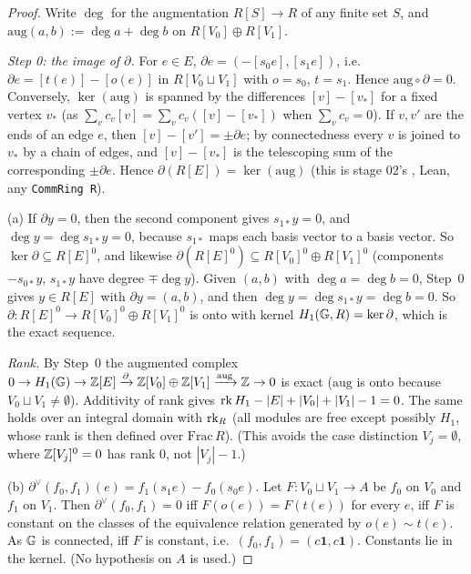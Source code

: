\begin{proof}
Write $\deg$ for the augmentation $R[S]\to R$ of any finite set $S$, and $\mathrm{aug}(a,b):=\deg a+\deg b$ on $R[V_0]\oplus R[V_1]$.

\emph{Step 0: the image of $\partial$.} For $e\in E$, $\partial e=(-[s_0e],[s_1e])$, i.e.\ $\partial e=[t(e)]-[o(e)]$ in $R[V_0\sqcup V_1]$ with
$o=s_0$, $t=s_1$. Hence $\mathrm{aug}\circ\partial=0$. Conversely, $\ker(\mathrm{aug})$ is spanned by the differences $[v]-[v_*]$ for a fixed vertex
$v_*$ (as $\sum_vc_v[v]=\sum_vc_v([v]-[v_*])$ when $\sum_vc_v=0$). If $v,v'$ are the ends of an edge $e$, then $[v]-[v']=\pm\partial e$; by
connectedness every $v$ is joined to $v_*$ by a chain of edges, and $[v]-[v_*]$ is the telescoping sum of the corresponding $\pm\partial e$. Hence
$\partial(R[E])=\ker(\mathrm{aug})$ (this is stage 02's , Lean, any \texttt{CommRing R}).

(a) If $\partial y=0$, then the second component gives $s_{1*}y=0$, and $\deg y=\deg s_{1*}y=0$, because $s_{1*}$ maps each basis vector to a basis
vector. So $\ker\partial\subseteq R[E]^0$, and likewise $\partial(R[E]^0)\subseteq R[V_0]^0\oplus R[V_1]^0$ (components $-s_{0*}y$, $s_{1*}y$ have degree
$\mp\deg y$). Given $(a,b)$ with $\deg a=\deg b=0$, Step~0 gives $y\in R[E]$ with $\partial y=(a,b)$, and then $\deg y=\deg s_{1*}y=\deg b=0$. So
$\partial:R[E]^0\to R[V_0]^0\oplus R[V_1]^0$ is onto with kernel $H_1(\mathbb{G},R)=\ker\partial$, which is the exact sequence.

\emph{Rank.} By Step~0 the augmented complex $0\to H_1(\mathbb{G})\to\mathbb{Z}[E]\xrightarrow{\partial}\mathbb{Z}[V_0]\oplus\mathbb{Z}[V_1]\xrightarrow{\mathrm{aug}}\mathbb{Z}\to0$ is exact
($\mathrm{aug}$ is onto because $V_0\sqcup V_1\ne\emptyset$). Additivity of rank gives $\operatorname{rk} H_1-|E|+|V_0|+|V_1|-1=0$. The same holds over an integral
domain with $\operatorname{rk}_R$ (all modules are free except possibly $H_1$, whose rank is then defined over $\mathrm{Frac}\,R$). (This avoids the case
distinction $V_j=\emptyset$, where $\mathbb{Z}[V_j]^0=0$ has rank $0$, not $|V_j|-1$.)

(b) $\partial^\vee(f_0,f_1)(e)=f_1(s_1e)-f_0(s_0e)$. Let $F:V_0\sqcup V_1\to A$ be $f_0$ on $V_0$ and $f_1$ on $V_1$. Then $\partial^\vee(f_0,f_1)=0$ iff
$F(o(e))=F(t(e))$ for every $e$, iff $F$ is constant on the classes of the equivalence relation generated by $o(e)\sim t(e)$. As $\mathbb{G}$ is connected,
iff $F$ is constant, i.e.\ $(f_0,f_1)=(c\mathbf1,c\mathbf1)$. Constants lie in the kernel. (No hypothesis on $A$ is used.)


\end{proof}
